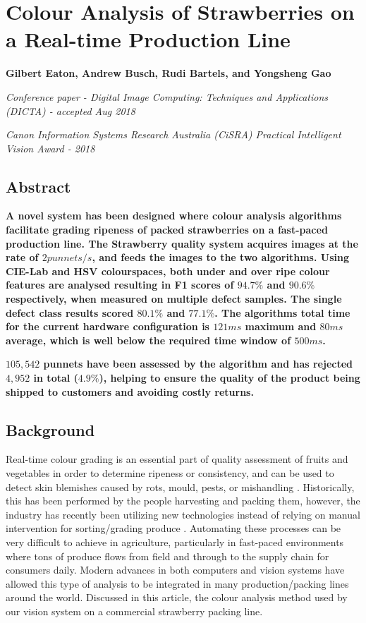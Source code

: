 \documentclass[fleqn,twoside,12pt]{report}
\begin{document}
\chapter{Colour Analysis of Strawberries on a Real-time Production Line}
\label{sec:paper_2}

\textbf{Gilbert Eaton, Andrew Busch, Rudi Bartels, and Yongsheng Gao}

\textit{Conference paper - Digital Image Computing: Techniques and Applications (DICTA) - accepted Aug 2018}

\textit{Canon Information Systems Research Australia (CiSRA) Practical Intelligent Vision Award - 2018}


\section{Abstract}

\textbf{A novel system has been designed where colour analysis algorithms facilitate grading ripeness of packed strawberries on a fast-paced production line. The Strawberry quality system acquires images at the rate of $2 punnets/s$, and feeds the images to the two algorithms. Using CIE-Lab and HSV colourspaces, both under and over ripe colour features are analysed  resulting in F1 scores of $94.7\%$ and $90.6\%$ respectively, when measured on multiple defect samples. The single defect class results scored $80.1\%$ and $77.1\%$. The algorithms total time for the current hardware configuration is $121ms$ maximum and $80ms$ average, which is well below the required time window of $500ms$.}
	
\textbf{$105,542$ punnets have been assessed by the algorithm and has rejected $4,952$ in total ($4.9\%$),  helping to ensure the quality of the product being shipped to customers and avoiding costly returns.}


\section{Background}

Real-time colour grading is an essential part of quality assessment of fruits and vegetables in order to determine ripeness or consistency, and can be used to detect skin blemishes caused by rots, mould, pests, or mishandling \cite{blasco3}. Historically, this has been performed by the people harvesting and packing them, however, the industry has recently been utilizing new technologies instead of relying on manual intervention for sorting/grading produce \cite{londhe}. Automating these processes can be very difficult to achieve in agriculture, particularly in fast-paced environments where tons of produce flows from field and through to the supply chain for consumers daily. Modern advances in both computers and vision systems have allowed this type of analysis to be integrated in many production/packing lines around the world. Discussed in this article, the colour analysis method used by our vision system on a commercial strawberry packing line.
\end{document}
